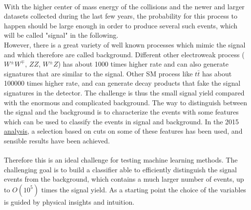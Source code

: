 \documentclass[11pt]{article}
\begin{document}
\paragraph{}
With the higher center of mass energy of the collisions and the newer and larger datasets collected during the last few years, the probability for this process to happen should be large enough in order to produce several such events, which will be called "signal" in the following.\\
However, there is a great variety of well known processes which mimic the signal and which therefore are called background. Different other electroweak process ($W^{\pm}W^{\mp}$, $ZZ$, $W^{\pm}Z$) has about 1000 times higher rate and can also generate signatures that are similar to the signal. Other SM process like $t\bar{t}$ has about 100000 times higher rate, and can generate decay products that fake the signal signatures in the detector. 
The challenge is thus the small signal yield compared with the enormous and complicated background. The way to distinguish between the signal and the background is to characterize the events with some features which can be used to classify the events in signal and background. In the 2015 \href{https://arxiv.org/abs/1610.05088}{analysis}, a selection based on cuts on some of these features has been used, and sensible results have been achieved. 

\paragraph{}
Therefore this is an ideal challenge for testing machine learning methods. The challenging goal is to build a classifier able to efficiently distinguish the signal events from the background, which contains a much larger number of events, up to $O(10^5)$ times the signal yield. As a starting point the choice of the variables is guided by physical insights and intuition.
\end{document}
